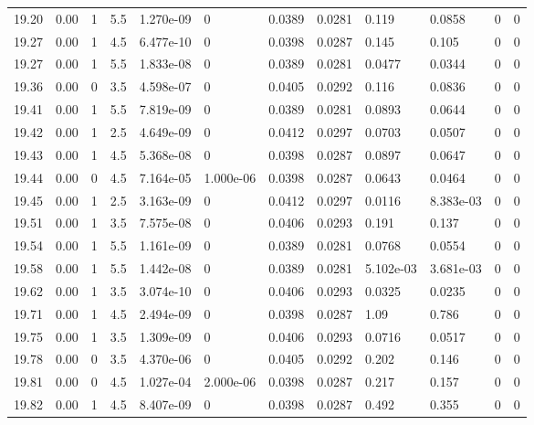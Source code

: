 \documentclass[preview]{standalone}
\begin{document}
{{{{{{{{{{{{{\begin{tabular}{L{1.2cm}C{1.2cm} C{0.3cm}C{0.5cm} C{1.4cm}C{1.4cm} C{1.4cm}C{1.4cm} C{1.6cm}C{1.6cm} C{1.6cm}C{1.6cm}}
  19.20  &  0.00  & 1     & 5.5 &  1.270e-09  & 0  &  0.0389&   0.0281& 0.119 & 0.0858   &  0 & 0  \\ 
  19.27  &  0.00  & 1     & 4.5 &  6.477e-10  & 0  &  0.0398&   0.0287& 0.145 & 0.105   &  0 & 0  \\ 
  19.27  &  0.00  & 1     & 5.5 &  1.833e-08  & 0  &  0.0389&   0.0281& 0.0477 & 0.0344   &  0 & 0  \\ 
  19.36  &  0.00  & 0     & 3.5 &  4.598e-07  & 0  &  0.0405&   0.0292& 0.116 & 0.0836   &  0 & 0  \\ 
  19.41  &  0.00  & 1     & 5.5 &  7.819e-09  & 0  &  0.0389&   0.0281& 0.0893 & 0.0644   &  0 & 0  \\ 
  19.42  &  0.00  & 1     & 2.5 &  4.649e-09  & 0  &  0.0412&   0.0297& 0.0703 & 0.0507   &  0 & 0  \\ 
  19.43  &  0.00  & 1     & 4.5 &  5.368e-08  & 0  &  0.0398&   0.0287& 0.0897 & 0.0647   &  0 & 0  \\ 
  19.44  &  0.00  & 0     & 4.5 &  7.164e-05  & 1.000e-06  &  0.0398&   0.0287& 0.0643 & 0.0464   &  0 & 0  \\ 
  19.45  &  0.00  & 1     & 2.5 &  3.163e-09  & 0  &  0.0412&   0.0297& 0.0116 & 8.383e-03   &  0 & 0  \\ 
  19.51  &  0.00  & 1     & 3.5 &  7.575e-08  & 0  &  0.0406&   0.0293& 0.191 & 0.137   &  0 & 0  \\ 
  19.54  &  0.00  & 1     & 5.5 &  1.161e-09  & 0  &  0.0389&   0.0281& 0.0768 & 0.0554   &  0 & 0  \\ 
  19.58  &  0.00  & 1     & 5.5 &  1.442e-08  & 0  &  0.0389&   0.0281& 5.102e-03 & 3.681e-03   &  0 & 0  \\ 
  19.62  &  0.00  & 1     & 3.5 &  3.074e-10  & 0  &  0.0406&   0.0293& 0.0325 & 0.0235   &  0 & 0  \\ 
  19.71  &  0.00  & 1     & 4.5 &  2.494e-09  & 0  &  0.0398&   0.0287& 1.09 & 0.786   &  0 & 0  \\ 
  19.75  &  0.00  & 1     & 3.5 &  1.309e-09  & 0  &  0.0406&   0.0293& 0.0716 & 0.0517   &  0 & 0  \\ 
  19.78  &  0.00  & 0     & 3.5 &  4.370e-06  & 0  &  0.0405&   0.0292& 0.202 & 0.146   &  0 & 0  \\ 
  19.81  &  0.00  & 0     & 4.5 &  1.027e-04  & 2.000e-06  &  0.0398&   0.0287& 0.217 & 0.157   &  0 & 0  \\ 
  19.82  &  0.00  & 1     & 4.5 &  8.407e-09  & 0  &  0.0398&   0.0287& 0.492 & 0.355   &  0 & 0  \\ 

\end{tabular}}}}}}}}}}}}}}
\end{document}
